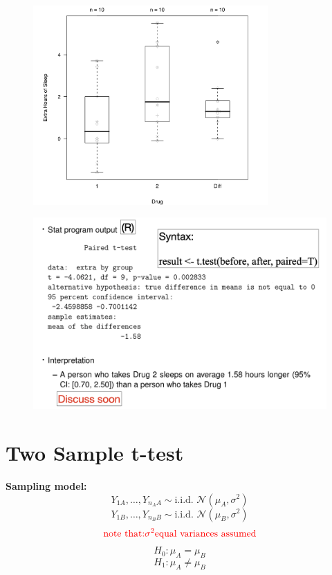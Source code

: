 \documentclass[14pt]{extarticle}
\begin{document}
\begin{figure}[H]
    \centering
    \includegraphics[width=0.8\textwidth]{fig11.png}
\end{figure}

\begin{figure}[H]
    \centering
    \includegraphics[width=1\textwidth]{fig12.png}
\end{figure}

\section*{Two Sample t-test}
\textbf{Sampling model:}
\[
Y_{1A}, \ldots, Y_{n_AA} \sim \text{i.i.d. } \mathcal{N}(\mu_A, \sigma^2)
\]
\[
Y_{1B}, \ldots, Y_{n_BB} \sim \text{i.i.d. } \mathcal{N}(\mu_B, \sigma^2)
\]
\[\textcolor{red}{\text{note that:} \sigma^2 \text{equal variances assumed}}\]
\[
H_0: \mu_A = \mu_B
\]
\[
H_1: \mu_A \neq \mu_B
\]
\end{document}
